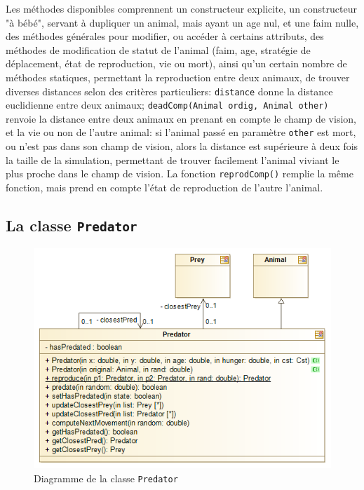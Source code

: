 \documentclass[12pt,a4paper,titlepage]{article}
\begin{document}
Les méthodes disponibles comprennent un constructeur explicite, un constructeur "à bébé", servant à dupliquer 
un animal, mais ayant un age nul, et une faim nulle, des méthodes générales pour modifier, ou accéder à 
certains attributs, des méthodes de modification de statut de l'animal (faim, age, stratégie de déplacement, 
état de reproduction, vie ou mort), ainsi qu'un certain nombre de méthodes statiques, permettant la 
reproduction entre deux animaux, de trouver diverses distances selon des critères particuliers: 
\texttt{distance} donne la distance euclidienne entre deux animaux; \texttt{deadComp(Animal ordig, Animal other)} renvoie la distance 
entre deux animaux en prenant en compte le champ de vision, et la vie ou non de l'autre animal: si l'animal 
passé en paramètre \texttt{other} est mort, ou n'est pas dans son champ de vision, alors la distance est 
supérieure à deux fois la taille de la simulation, permettant de trouver facilement l'animal viviant le plus 
proche dans le champ de vision. La fonction \texttt{reprodComp()} remplie la même fonction, mais prend en compte 
l'état de reproduction de l'autre l'animal.
\FloatBarrier
\subsection{La classe \texttt{Predator}}
\FloatBarrier
\begin{figure}[h]
\includegraphics[width = \textwidth]{"../diagrammes/predator"}
\caption{Diagramme de la classe \texttt{Predator}}
\label{predator}
\end{figure}
\end{document}
